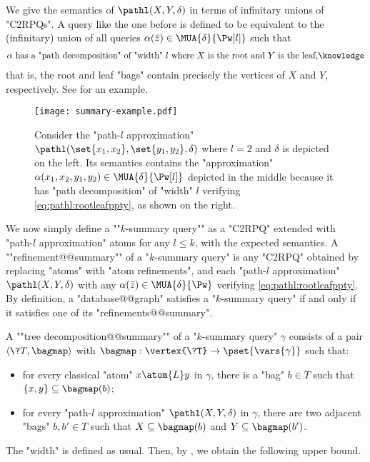 We give the semantics of $\pathl(X, Y, \delta)$ in terms of infinitary unions of "C2RPQs".
A query like the one before is defined to be equivalent to the (infinitary) union of all queries $\alpha(\bar z) \in \MUA{\delta}{\Pw[l]}$ such that
\begin{align}
	\text{$\alpha$ has a "path decomposition" of "width" $l$ where $X$ is the root and $Y$ is the leaf,}\AP\label{eq:pathl:rootleafppty}
\end{align}
that is, the root and leaf "bags" contain precisely the vertices of $X$ and $Y$, respectively.
 See  for an example.
\begin{figure}
  \centering
  \texttt{[image: summary-example.pdf]}
  \caption{
	\AP\label{fig:l-path-example}
	Consider the "path-$l$ approximation" $\pathl(\set{x_1,x_2}, \set{y_1,y_2},\delta)$ where $l=2$ and $\delta$ is depicted on the left. Its semantics contains the "approximation" $\alpha(x_1,x_2,y_1,y_2) \in \MUA{\delta}{\Pw[l]}$ depicted in the middle because it has "path decomposition" of "width" $l$ verifying \eqref{eq:pathl:rootleafppty}, as shown on the right.
	}
\end{figure}

\AP We now simply define a ""$k$-summary query"" as a "C2RPQ" extended with "path-$l$ approximation" atoms for any $l\leq k$, with the expected semantics.
A \AP""refinement@@summary"" of a "$k$-summary query" is any "C2RPQ" obtained by
replacing "atoms" with "atom refinements", and 
each "path-$l$ approximation" $\pathl(X, Y, \delta)$ with any
$\alpha(\bar z) \in \MUA{\delta}{\Pw}$ verifying \eqref{eq:pathl:rootleafppty}. By definition,
a "database@@graph" satisfies a "$k$-summary query" if and only if it
satisfies one of its "refinements@@summary".

A \AP ""tree decomposition@@summary"" of a "$k$-summary query" $\gamma$ consists of
a pair $\tup{\?T, \bagmap}$ with $\bagmap: \vertex{\?T} \to \pset{\vars{\gamma}}$
such that:
\begin{itemize}
	\item for every classical "atom" $x \atom{L} y$ in $\gamma$,
		there is a "bag" $b \in T$ such that $\{x,y\} \subseteq \bagmap(b)$;
	\item for every "path-$l$ approximation" $\pathl(X, Y, \delta)$ in $\gamma$,
		there are two adjacent "bags" $b, b' \in T$ such that $X \subseteq \bagmap(b)$
		and $Y \subseteq \bagmap(b')$.
\end{itemize}
The "width" is defined as usual. Then, by
, we obtain the following upper bound.

